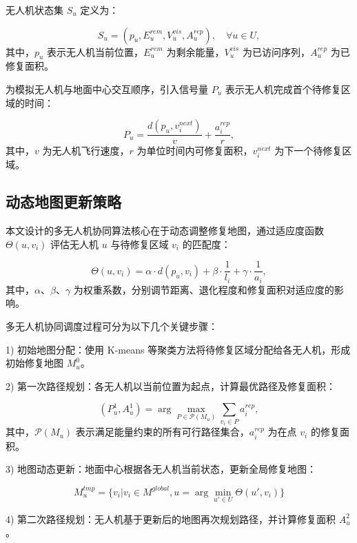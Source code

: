 \documentclass[AutoFakeBold]{LZUThesis}
\begin{document}
无人机状态集 $S_u$ 定义为：

\begin{equation}
	S_u = (p_u, E_u^{rem}, V_u^{vis}, A_u^{rep}), \quad \forall u \in U,
\end{equation}
其中，$p_u$ 表示无人机当前位置，$E_u^{rem}$ 为剩余能量，$V_u^{vis}$ 为已访问序列，$A_u^{rep}$ 为已修复面积。

为模拟无人机与地面中心交互顺序，引入信号量 $P_u$ 表示无人机完成首个待修复区域的时间：

\begin{equation}
	P_u = \frac{d(p_u, v_i^{next})}{v} + \frac{a_i^{rep}}{r},
\end{equation}
其中，$v$ 为无人机飞行速度，$r$ 为单位时间内可修复面积，$v_i^{next}$ 为下一个待修复区域。

\subsection{动态地图更新策略}

本文设计的多无人机协同算法核心在于动态调整修复地图，通过适应度函数 $\Theta(u,v_i)$ 评估无人机 $u$ 与待修复区域 $v_i$ 的匹配度：

\begin{equation}
	\Theta(u,v_i) = \alpha \cdot d(p_u, v_i) + \beta \cdot \frac{1}{l_i} + \gamma \cdot \frac{1}{a_i},
\end{equation}
其中，$\alpha$、$\beta$、$\gamma$ 为权重系数，分别调节距离、退化程度和修复面积对适应度的影响。

多无人机协同调度过程可分为以下几个关键步骤：

1) 初始地图分配：使用 K-means 等聚类方法将待修复区域分配给各无人机，形成初始修复地图 $M_u^0$。

2) 第一次路径规划：各无人机以当前位置为起点，计算最优路径及修复面积：

\begin{equation}
	(P_u^1, A_u^1) = \arg\max_{P \in \mathcal{P}(M_u)} \sum_{v_i \in P} a_i^{rep},
\end{equation}
其中，$\mathcal{P}(M_u)$ 表示满足能量约束的所有可行路径集合，$a_i^{rep}$ 为在点 $v_i$ 的修复面积。

3) 地图动态更新：地面中心根据各无人机当前状态，更新全局修复地图：

\begin{equation}
	M_u^{tmp} = \{v_i | v_i \in M^{global}, u = \arg\min_{u' \in U} \Theta(u',v_i)\}
\end{equation}

4) 第二次路径规划：无人机基于更新后的地图再次规划路径，并计算修复面积 $A_u^2$。
\end{document}
